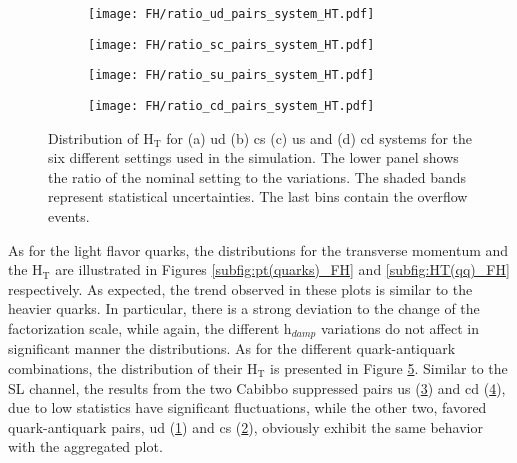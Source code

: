 \begin{figure}[H]
    \centering
    \begin{subfigure}{0.49\textwidth}
        \centering
        \texttt{[image: FH/ratio\_ud\_pairs\_system\_HT.pdf]}
        \caption{}
        \label{subfig:HT(ud)_FH}        
    \end{subfigure}
    \hfill
    \begin{subfigure}{0.49\textwidth}
        \centering
        \texttt{[image: FH/ratio\_sc\_pairs\_system\_HT.pdf]}
        \caption{}
        \label{subfig:HT(cs)_FH}        
    \end{subfigure}
    \hfill
        \begin{subfigure}{0.49\textwidth}
        \centering
        \texttt{[image: FH/ratio\_su\_pairs\_system\_HT.pdf]}
        \caption{}
        \label{subfig:HT(us)_FH}        
    \end{subfigure}
    \hfill
    \begin{subfigure}{0.49\textwidth}
        \centering
        \texttt{[image: FH/ratio\_cd\_pairs\_system\_HT.pdf]}
        \caption{}
        \label{subfig:HT(cd)_FH}        
    \end{subfigure}
    \caption{Distribution of H$_{\text{T}}$ for (a) ud (b) cs (c) us and (d) cd systems for the six different settings used in the simulation. The lower panel shows the ratio of the nominal setting to the variations. The shaded bands represent statistical uncertainties. The last bins contain the overflow events.}
    \label{fig:quarks_FH}
\end{figure}
\indent As for the light flavor quarks, the distributions for the transverse momentum and the H$_{\text{T}}$ are illustrated in Figures \ref{subfig:pt(quarks)_FH} and \ref{subfig:HT(qq)_FH} respectively. As expected, the trend observed in these plots is similar to the heavier quarks. In particular, there is a strong deviation to the change of the factorization scale, while again, the different h$_{damp}$ variations do not affect in significant manner the distributions. As for the different quark-antiquark combinations, the distribution of their H$_{\text{T}}$ is presented in Figure \ref{fig:quarks_FH}. Similar to the SL channel, the results from the two Cabibbo suppressed pairs us (\ref{subfig:HT(us)_FH}) and cd (\ref{subfig:HT(cd)_FH}), due to low statistics have significant fluctuations, while the other two, favored quark-antiquark pairs, ud (\ref{subfig:HT(ud)_FH}) and cs (\ref{subfig:HT(cs)_FH}), obviously exhibit the same behavior with the aggregated plot.
